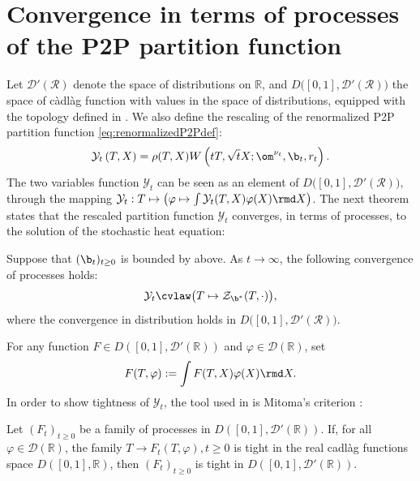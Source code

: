 \section{Convergence in terms of processes of the P2P partition function}
\label{sec:proofCVProcesses}
Let $\mathcal{D}'(\mathcal R)$ denote the space of distributions on $\mathbb{R}$, and $D\big([0,1],\mathcal{D}'(\mathcal R)\big)$ the space of c\`adl\`ag function with values in the space of distributions, equipped with the topology defined in \cite{mitoma1983tightness}.
We also define the rescaling of the renormalized P2P partition function \eqref{eq:renormalizedP2Pdef}:
\begin{equation}
\mathcal{Y}_t\left(T,X\right) = \rho(T,X) W\left(tT,\sqrt{t}X;\om^{\nu_t},\b_t,r_t\right).
\end{equation}
The two variables function $\mathcal{Y}_t$ can be seen as an element of $D\big([0,1],\mathcal{D}'(\mathcal R)\big)$, through the mapping $\mathcal{Y}_t : T \mapsto \big(\varphi \mapsto \int \mathcal{Y}_t(T,X)\varphi(X)\rmd X\big)$. The next theorem states that the rescaled partition function $\mathcal{Y}_t$ converges, in terms of processes, to the solution of the stochastic heat equation:
\begin{theorem} \label{th:cvlaw} \textup{\cite{CoscoIntermediate}}
Suppose that $(\b_t)_{t\geq 0}$ is bounded by above. As $t\to\infty$, the following convergence of processes holds:
\begin{equation}
\mathcal{Y}_t \cvlaw \big(T\mapsto \mathcal{Z}_{\b^*}(T,\cdot)\big),
\end{equation}
where the convergence in distribution holds in $D\big([0,1],\mathcal{D}'(\mathcal R)\big)$.
\end{theorem}
For any function $F\in D\left([0,1],\mathcal{D}'(\mathbb{R})\right)$ and $\varphi\in \mathcal{D}(\mathbb{R})$, set
\begin{equation}
F(T,\varphi) := \int F(T,X)\varphi(X)\rmd X.
\end{equation}
In order to show tightness of $\mathcal{Y}_t$, the tool used in \cite{CoscoIntermediate} is Mitoma's criterion \cite{mitoma1983tightness,Walsh}:
\begin{proposition} \label{th:Mitoma}
Let $(F_t)_{t\geq 0}$ be a family of processes in $D\left([0,1],\mathcal{D}'(\mathbb{R})\right)$. If, for all $\varphi \in \mathcal{D}(\mathbb{R})$, the family $T\to F_t(T,\varphi),t\geq 0$ is tight in the real cadl\`ag functions space $D([0,1],\mathbb{R})$, then $(F_t)_{t\geq 0}$ is tight in $D\left([0,1],\mathcal{D}'(\mathbb{R})\right)$.
\end{proposition}
